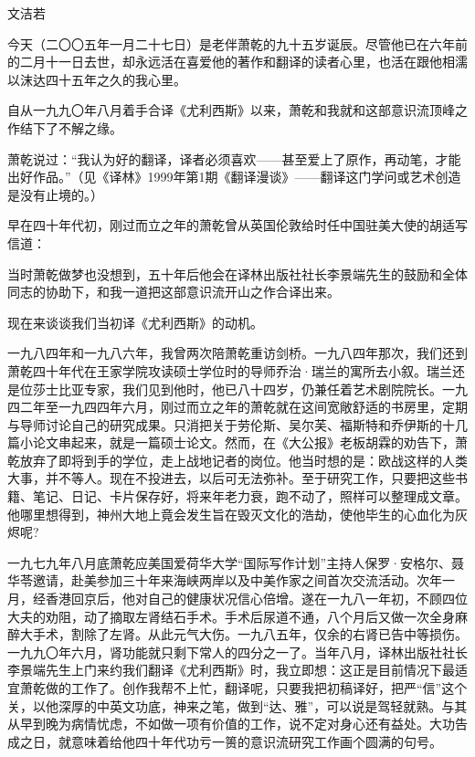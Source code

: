\begin{center}
    \par 文洁若
\end{center}
\par 今天（二〇〇五年一月二十七日）是老伴萧乾的九十五岁诞辰。尽管他已在六年前的二月十一日去世，却永远活在喜爱他的著作和翻译的读者心里，也活在跟他相濡以沫达四十五年之久的我心里。
\par 自从一九九〇年八月着手合译《尤利西斯》以来，萧乾和我就和这部意识流顶峰之作结下了不解之缘。
\par 萧乾说过：“我认为好的翻译，译者必须喜欢——甚至爱上了原作，再动笔，才能出好作品。”（见《译林》1999年第1期《翻译漫谈》——翻译这门学问或艺术创造是没有止境的。）
\par 早在四十年代初，刚过而立之年的萧乾曾从英国伦敦给时任中国驻美大使的胡适写信道：
\par 当时萧乾做梦也没想到，五十年后他会在译林出版社社长李景端先生的鼓励和全体同志的协助下，和我一道把这部意识流开山之作合译出来。
\par 现在来谈谈我们当初译《尤利西斯》的动机。
\par 一九八四年和一九八六年，我曾两次陪萧乾重访剑桥。一九八四年那次，我们还到萧乾四十年代在王家学院攻读硕士学位时的导师乔治·瑞兰的寓所去小叙。瑞兰还是位莎士比亚专家，我们见到他时，他已八十四岁，仍兼任着艺术剧院院长。一九四二年至一九四四年六月，刚过而立之年的萧乾就在这间宽敞舒适的书房里，定期与导师讨论自己的研究成果。只消把关于劳伦斯、吴尔芙、福斯特和乔伊斯的十几篇小论文串起来，就是一篇硕士论文。然而，在《大公报》老板胡霖的劝告下，萧乾放弃了即将到手的学位，走上战地记者的岗位。他当时想的是：欧战这样的人类大事，并不等人。现在不投进去，以后可无法弥补。至于研究工作，只要把这些书籍、笔记、日记、卡片保存好，将来年老力衰，跑不动了，照样可以整理成文章。他哪里想得到，神州大地上竟会发生旨在毁灭文化的浩劫，使他毕生的心血化为灰烬呢?
\par 一九七九年八月底萧乾应美国爱荷华大学“国际写作计划”主持人保罗·安格尔、聂华苓邀请，赴美参加三十年来海峡两岸以及中美作家之间首次交流活动。次年一月，经香港回京后，他对自己的健康状况信心倍增。遂在一九八一年初，不顾四位大夫的劝阻，动了摘取左肾结石手术。手术后尿道不通，八个月后又做一次全身麻醉大手术，割除了左肾。从此元气大伤。一九八五年，仅余的右肾已告中等损伤。一九九〇年六月，肾功能就只剩下常人的四分之一了。当年八月，译林出版社社长李景端先生上门来约我们翻译《尤利西斯》时，我立即想：这正是目前情况下最适宜萧乾做的工作了。创作我帮不上忙，翻译呢，只要我把初稿译好，把严“信”这个关，以他深厚的中英文功底，神来之笔，做到“达、雅”，可以说是驾轻就熟。与其从早到晚为病情忧虑，不如做一项有价值的工作，说不定对身心还有益处。大功告成之日，就意味着给他四十年代功亏一篑的意识流研究工作画个圆满的句号。
